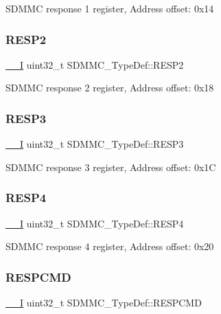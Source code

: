 S\+D\+M\+MC response 1 register, Address offset\+: 0x14 \mbox{\label{struct_s_d_m_m_c___type_def_a3f1ab9eeca1d08e5fc50b6a8a0ee0257}} 
\subsubsection{\texorpdfstring{RESP2}{RESP2}}
{\footnotesize\ttfamily \mbox{\hyperlink{core__sc300_8h_af63697ed9952cc71e1225efe205f6cd3}{\+\_\+\+\_\+I}} uint32\+\_\+t S\+D\+M\+M\+C\+\_\+\+Type\+Def\+::\+R\+E\+S\+P2}

S\+D\+M\+MC response 2 register, Address offset\+: 0x18 \mbox{\label{struct_s_d_m_m_c___type_def_ae4a9250b0100c1a251354d64dde42300}} 
\subsubsection{\texorpdfstring{RESP3}{RESP3}}
{\footnotesize\ttfamily \mbox{\hyperlink{core__sc300_8h_af63697ed9952cc71e1225efe205f6cd3}{\+\_\+\+\_\+I}} uint32\+\_\+t S\+D\+M\+M\+C\+\_\+\+Type\+Def\+::\+R\+E\+S\+P3}

S\+D\+M\+MC response 3 register, Address offset\+: 0x1C \mbox{\label{struct_s_d_m_m_c___type_def_aebd8ffdd133537059f29fd5fecd6e290}} 
\subsubsection{\texorpdfstring{RESP4}{RESP4}}
{\footnotesize\ttfamily \mbox{\hyperlink{core__sc300_8h_af63697ed9952cc71e1225efe205f6cd3}{\+\_\+\+\_\+I}} uint32\+\_\+t S\+D\+M\+M\+C\+\_\+\+Type\+Def\+::\+R\+E\+S\+P4}

S\+D\+M\+MC response 4 register, Address offset\+: 0x20 \mbox{\label{struct_s_d_m_m_c___type_def_a33c78086429a7eed4d57a5633a9d78f2}} 
\subsubsection{\texorpdfstring{RESPCMD}{RESPCMD}}
{\footnotesize\ttfamily \mbox{\hyperlink{core__sc300_8h_af63697ed9952cc71e1225efe205f6cd3}{\+\_\+\+\_\+I}} uint32\+\_\+t S\+D\+M\+M\+C\+\_\+\+Type\+Def\+::\+R\+E\+S\+P\+C\+MD}

